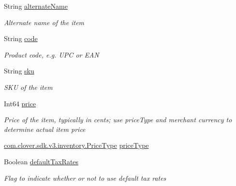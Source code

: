 \begin{DoxyCompactItemize}
String \hyperlink{classcom_1_1clover_1_1sdk_1_1v3_1_1inventory_1_1_item_ac82a6eec76936ce59c611e01a3c112fb}{alternate\+Name}
\begin{DoxyCompactList}\small\item\em Alternate name of the item \end{DoxyCompactList}\item 
String \hyperlink{classcom_1_1clover_1_1sdk_1_1v3_1_1inventory_1_1_item_a9136170e39444f43307d1b53782864c5}{code}
\begin{DoxyCompactList}\small\item\em Product code, e.\+g. U\+PC or E\+AN \end{DoxyCompactList}\item 
String \hyperlink{classcom_1_1clover_1_1sdk_1_1v3_1_1inventory_1_1_item_ab31416347cfb11689955a6118a272964}{sku}
\begin{DoxyCompactList}\small\item\em S\+KU of the item \end{DoxyCompactList}\item 
Int64 \hyperlink{classcom_1_1clover_1_1sdk_1_1v3_1_1inventory_1_1_item_a76cae4be53be49e7205dcb7427eb5d13}{price}
\begin{DoxyCompactList}\small\item\em Price of the item, typically in cents; use price\+Type and merchant currency to determine actual item price \end{DoxyCompactList}\item 
\hyperlink{namespacecom_1_1clover_1_1sdk_1_1v3_1_1inventory_a29563083c5ea6797e6ce5b3f5a1d2f12}{com.\+clover.\+sdk.\+v3.\+inventory.\+Price\+Type} \hyperlink{classcom_1_1clover_1_1sdk_1_1v3_1_1inventory_1_1_item_ac63cf057404352aa1897a353206fcdb2}{price\+Type}
\item 
Boolean \hyperlink{classcom_1_1clover_1_1sdk_1_1v3_1_1inventory_1_1_item_acbf6749208f7de59859cfd6042840b65}{default\+Tax\+Rates}
\begin{DoxyCompactList}\small\item\em Flag to indicate whether or not to use default tax rates \end{DoxyCompactList}\item 

\end{DoxyCompactItemize}
